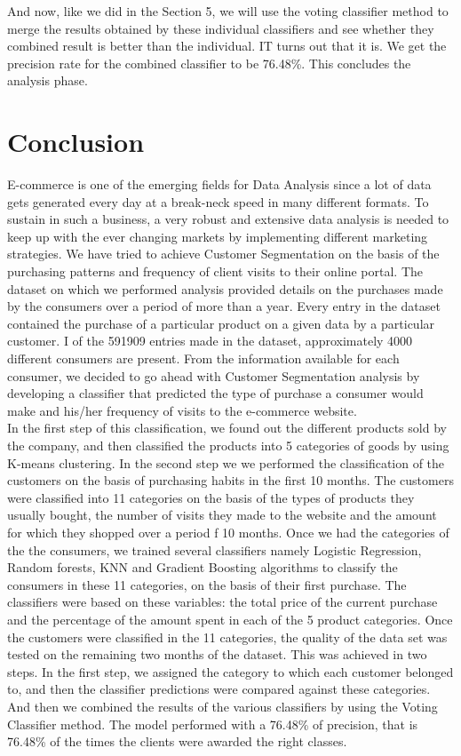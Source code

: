 And now, like we did in the Section 5, we will use the voting classifier method to merge the results obtained by these individual classifiers and see whether they combined result is better than the individual. IT turns out that it is. We get the precision rate for the combined classifier to be 76.48\%. This concludes the analysis phase.\\

\section{Conclusion}
E-commerce is one of the emerging fields for Data Analysis since a lot of data gets generated every day at a break-neck speed in many different formats. To sustain in such a business, a very robust and extensive data analysis is needed to keep up with the ever changing markets by implementing different marketing strategies. We have tried to achieve Customer Segmentation on the basis of the purchasing patterns and frequency of client visits to their online portal. The dataset on which we performed analysis provided details on the purchases made by the consumers over a period of more than a year. Every entry in the dataset contained the purchase of a particular product on a given data by a particular customer. I  of the 591909 entries made in the dataset, approximately 4000 different consumers are present. From the information available for each consumer, we decided to go ahead with Customer Segmentation analysis by developing a classifier that predicted the type of purchase a consumer would make and his/her frequency of visits to the e-commerce website. \\
In the first step of this classification, we found out the different products sold by the company, and then classified the products into 5 categories of goods by using K-means clustering. In the second step we we performed the classification of the customers on the basis of purchasing habits in the first 10 months. The customers were classified into 11 categories on the basis of the types of products they usually bought, the number of visits they made to the website and the amount for which they shopped over a period f 10 months. Once we had the categories of the the consumers, we trained several classifiers namely Logistic Regression, Random forests, KNN and Gradient Boosting algorithms to classify the consumers in these 11 categories, on the basis of their first purchase. The classifiers were based on these variables: the total price of the current purchase and the percentage of the amount spent in each of the 5 product categories. Once the customers were classified in the 11 categories, the quality of the data set was tested on the remaining two months of the dataset. This was achieved in two steps. In the first step, we assigned the category to which each customer belonged to, and then the classifier predictions were compared against these categories. And then we combined the results of the various classifiers by using the Voting Classifier method. The model performed with a 76.48\% of precision, that is 76.48\% of the times the clients were awarded the right classes.\\
